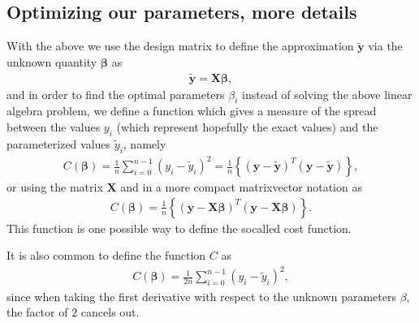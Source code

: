 \documentclass[letterpaper,10pt,english]{sphinxmanual}
\begin{document}
\subsection{Optimizing our parameters, more details}
\label{\detokenize{chapter4:optimizing-our-parameters-more-details}}
With the above we use the design matrix to define the approximation \(\boldsymbol{\tilde{y}}\) via the unknown quantity \(\boldsymbol{\beta}\) as
\begin{equation*}
\begin{split}
\boldsymbol{\tilde{y}}= \boldsymbol{X}\boldsymbol{\beta},
\end{split}
\end{equation*}
and in order to find the optimal parameters \(\beta_i\) instead of solving the above linear algebra problem, we define a function which gives a measure of the spread between the values \(y_i\) (which represent hopefully the exact values) and the parameterized values \(\tilde{y}_i\), namely
\begin{equation*}
\begin{split}
C(\boldsymbol{\beta})=\frac{1}{n}\sum_{i=0}^{n-1}\left(y_i-\tilde{y}_i\right)^2=\frac{1}{n}\left\{\left(\boldsymbol{y}-\boldsymbol{\tilde{y}}\right)^T\left(\boldsymbol{y}-\boldsymbol{\tilde{y}}\right)\right\},
\end{split}
\end{equation*}
or using the matrix \(\boldsymbol{X}\) and in a more compact matrix\sphinxhyphen{}vector notation as
\begin{equation*}
\begin{split}
C(\boldsymbol{\beta})=\frac{1}{n}\left\{\left(\boldsymbol{y}-\boldsymbol{X}\boldsymbol{\beta}\right)^T\left(\boldsymbol{y}-\boldsymbol{X}\boldsymbol{\beta}\right)\right\}.
\end{split}
\end{equation*}
This function is one possible way to define the so\sphinxhyphen{}called cost function.

It is also common to define
the function \(C\) as
\begin{equation*}
\begin{split}
C(\boldsymbol{\beta})=\frac{1}{2n}\sum_{i=0}^{n-1}\left(y_i-\tilde{y}_i\right)^2,
\end{split}
\end{equation*}
since when taking the first derivative with respect to the unknown parameters \(\beta\), the factor of \(2\) cancels out.
\end{document}
